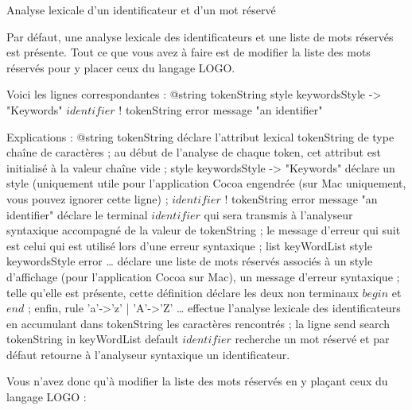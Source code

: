 Analyse lexicale d'un identificateur et d'un mot réservé

Par défaut, une analyse lexicale des identificateurs et une liste de mots réservés est présente. Tout ce que vous avez à faire est de modifier la liste des mots réservés pour y placer ceux du langage LOGO.

Voici les lignes correspondantes :
@string tokenString
style keywordsStyle -> "Keywords"
$identifier$ ! tokenString error message "an identifier"


Explications :
@string tokenString déclare l’attribut lexical tokenString de type chaîne de caractères ; au début de l’analyse de chaque token, cet attribut est initialisé à la valeur chaîne vide ;
style keywordsStyle -> "Keywords" déclare un style (uniquement utile pour l’application Cocoa engendrée (sur Mac uniquement, vous pouvez ignorer cette ligne) ;
$identifier$ ! tokenString error message "an identifier" déclare le terminal $identifier$ qui sera transmis à l’analyseur syntaxique accompagné de la valeur de tokenString ;  le message d’erreur qui suit est celui qui est utilisé lors d’une erreur syntaxique ;
list keyWordList style keywordsStyle error … déclare une liste de mots réservés associés à un style d’affichage (pour l’application Cocoa sur Mac), un message d’erreur syntaxique ; telle qu’elle est présente, cette définition déclare les deux non terminaux $begin$ et $end$ ;
enfin, rule 'a'->'z' | 'A'->'Z' … effectue l’analyse lexicale des identificateurs en accumulant dans tokenString les caractères rencontrés ; la ligne send search tokenString in keyWordList default $identifier$ recherche un mot réservé et par défaut retourne à l’analyseur syntaxique un identificateur.

Vous n’avez donc qu’à modifier la liste des mots réservés en y plaçant ceux du langage LOGO :

